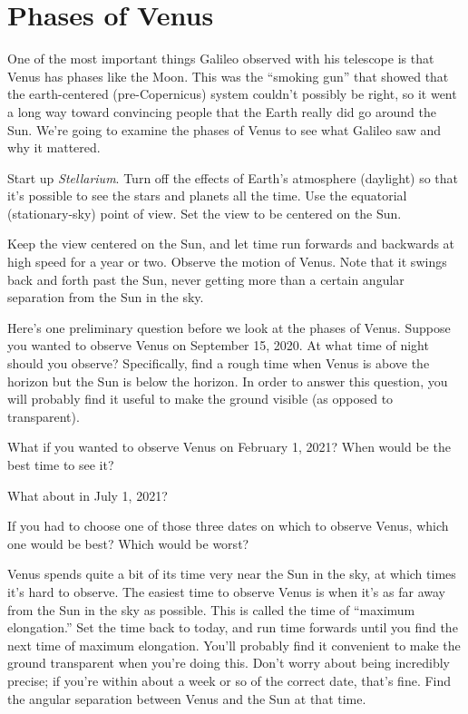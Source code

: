 \section{Phases of Venus}

\makelabheader 

One of the most important things Galileo observed with his telescope is that
Venus has phases like the Moon.   This was the ``smoking gun'' that showed
that the earth-centered (pre-Copernicus) system couldn't possibly be right,
so it went a long way toward convincing people that the Earth really did
go around the Sun.  We're going to examine the phases of Venus to see what
Galileo saw and why it mattered. 

Start up \textit{Stellarium}.
Turn off 
the effects of Earth's atmosphere (daylight)
so that it's possible to see the stars and planets all the time.
Use the equatorial (stationary-sky) point of view.
Set the view to be centered on the Sun.

Keep the view centered on the Sun, and let time run forwards and backwards 
at high speed for a year or two.
Observe the motion of Venus.  Note that it swings back and forth past the Sun,
never getting more than a certain angular separation from the Sun in the sky. 

Here's one preliminary question before we look at the phases of Venus.
Suppose you wanted to observe Venus on September 15, 2020.
At what time of night should you
observe?  Specifically, find a rough time when Venus is above the
horizon but the Sun is below the horizon. In order to answer this
question, you will probably find it useful to make the ground visible (as
opposed to
transparent).



\answerspace{0.7in}

What if you wanted to observe Venus on February 1, 2021? When would be the
best time to see it?

\answerspace{ 0.7in}

What about in July 1, 2021?

\answerspace{ 0.7in}


If you had to choose one of those three dates on which to observe
Venus, which one would be best? Which would be worst?

\answerspace{ 0.7in}

\pagebreak[4]
Venus spends quite a bit of its time very near the Sun in the sky,
at which times it's hard to observe.
The easiest time to observe Venus is when it's as far away from
the Sun in the sky as possible.  This is called the time of ``maximum
elongation.''  Set the time back to today, 
and run time forwards until you find the next time of maximum
elongation. You'll probably find it convenient to make the ground transparent
when you're doing this.
Don't worry about being incredibly precise; if you're
within about a week or so of the correct date, that's fine.
Find the angular
separation between
Venus and the Sun at that time. 

